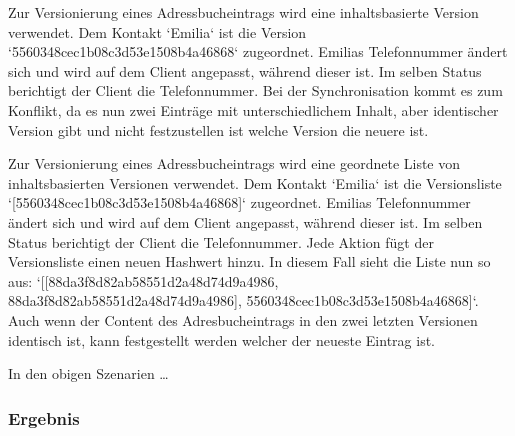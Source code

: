 \begin{description}[leftmargin=0.5cm,style=nextline]
  \item[Szenario V5:]%
  Zur Versionierung eines Adressbucheintrags wird eine inhaltsbasierte Version verwendet.
  Dem Kontakt `Emilia` ist die Version `5560348cec1b08c3d53e1508b4a46868` zugeordnet. Emilias Telefonnummer ändert sich und wird auf dem Client angepasst, während dieser  ist. Im selben Status berichtigt der Client die Telefonnummer. Bei der Synchronisation kommt es zum Konflikt, da es nun zwei Einträge mit unterschiedlichem Inhalt, aber identischer Version gibt und nicht festzustellen ist welche Version die neuere ist.\\
  \item[Szenario V6:] %
  Zur Versionierung eines Adressbucheintrags wird eine geordnete Liste von inhaltsbasierten Versionen verwendet.
  Dem Kontakt `Emilia` ist die Versionsliste `[5560348cec1b08c3d53e1508b4a46868]` zugeordnet. Emilias Telefonnummer ändert sich und wird auf dem Client angepasst, während dieser  ist. Im selben Status berichtigt der Client die Telefonnummer. Jede Aktion fügt der Versionsliste einen neuen Hashwert hinzu. In diesem Fall sieht die Liste nun so aus: `[[88da3f8d82ab58551d2a48d74d9a4986, 88da3f8d82ab58551d2a48d74d9a4986], 5560348cec1b08c3d53e1508b4a46868]`. Auch wenn der Content des Adresbucheintrags in den zwei letzten Versionen identisch ist, kann festgestellt werden welcher der neueste Eintrag ist.
\end{description}
%
%
%
In den obigen Szenarien \ldots
%
%
\subsubsection*{Ergebnis}